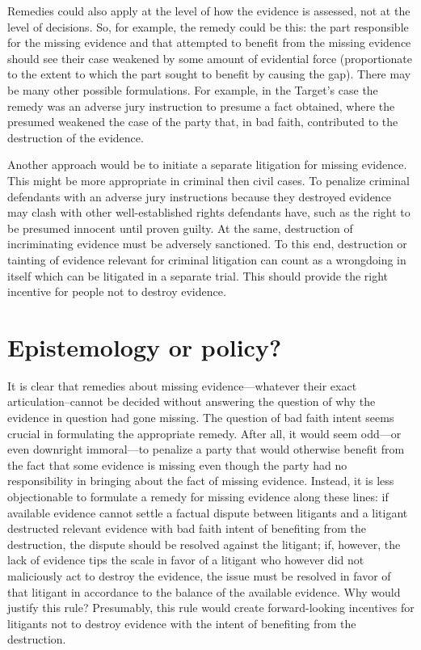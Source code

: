 \documentclass[
  10pt,
  dvipsnames,enabledeprecatedfontcommands]{scrartcl}
\begin{document}
Remedies could also apply at the level of how the evidence is assessed,
not at the level of decisions. So, for example, the remedy could be
this: the part responsible for the missing evidence and that attempted
to benefit from the missing evidence should see their case weakened by
some amount of evidential force (proportionate to the extent to which
the part sought to benefit by causing the gap). There may be many other
possible formulations. For example, in the Target's case the remedy was
an adverse jury instruction to presume a fact obtained, where the
presumed weakened the case of the party that, in bad faith, contributed
to the destruction of the evidence.

Another approach would be to initiate a separate litigation for missing
evidence. This might be more appropriate in criminal then civil cases.
To penalize criminal defendants with an adverse jury instructions
because they destroyed evidence may clash with other well-established
rights defendants have, such as the right to be presumed innocent until
proven guilty. At the same, destruction of incriminating evidence must
be adversely sanctioned. To this end, destruction or tainting of
evidence relevant for criminal litigation can count as a wrongdoing in
itself which can be litigated in a separate trial. This should provide
the right incentive for people not to destroy evidence.

\hypertarget{epistemology-or-policy}{%
\section{Epistemology or policy?}\label{epistemology-or-policy}}

It is clear that remedies about missing evidence---whatever their exact
articulation--cannot be decided without answering the question of why
the evidence in question had gone missing. The question of bad faith
intent seems crucial in formulating the appropriate remedy. After all,
it would seem odd---or even downright immoral---to penalize a party that
would otherwise benefit from the fact that some evidence is missing even
though the party had no responsibility in bringing about the fact of
missing evidence. Instead, it is less objectionable to formulate a
remedy for missing evidence along these lines: if available evidence
cannot settle a factual dispute between litigants and a litigant
destructed relevant evidence with bad faith intent of benefiting from
the destruction, the dispute should be resolved against the litigant;
if, however, the lack of evidence tips the scale in favor of a litigant
who however did not maliciously act to destroy the evidence, the issue
must be resolved in favor of that litigant in accordance to the balance
of the available evidence. Why would justify this rule? Presumably, this
rule would create forward-looking incentives for litigants not to
destroy evidence with the intent of benefiting from the destruction.
\end{document}
